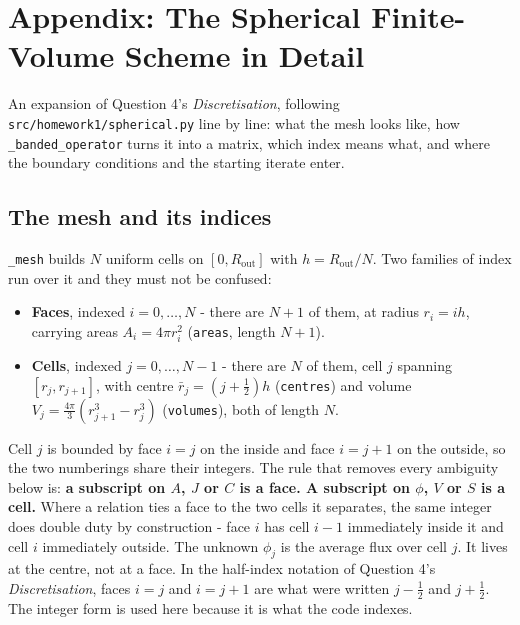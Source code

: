 \documentclass[11pt]{article}
\begin{document}
\clearpage
\appendix

{\color{red}

\section*{Appendix: The Spherical Finite-Volume Scheme in Detail}
\label{app:fv}

An expansion of Question 4's \emph{Discretisation}, following \texttt{src/homework1/spherical.py} line by line: what the mesh looks like, how \texttt{\_banded\_operator} turns it into a matrix, which index means what, and where the boundary conditions and the starting iterate enter.

\subsection*{The mesh and its indices}

\texttt{\_mesh} builds $N$ uniform cells on $[0, R_{\text{out}}]$ with $h = R_{\text{out}}/N$. Two families of index run over it and they must not be confused:

\begin{itemize}
    \item \textbf{Faces}, indexed $i = 0,\dots,N$ - there are $N+1$ of them, at radius $r_i = i h$, carrying areas $A_i = 4\pi r_i^2$ (\texttt{areas}, length $N+1$).
    \item \textbf{Cells}, indexed $j = 0,\dots,N-1$ - there are $N$ of them, cell $j$ spanning $[r_j, r_{j+1}]$, with centre $\bar r_j = (j + \tfrac12)h$ (\texttt{centres}) and volume $V_j = \tfrac{4\pi}{3}(r_{j+1}^3 - r_j^3)$ (\texttt{volumes}), both of length $N$.
\end{itemize}

Cell $j$ is bounded by face $i = j$ on the inside and face $i = j+1$ on the outside, so the two numberings share their integers. The rule that removes every ambiguity below is: \textbf{a subscript on $A$, $J$ or $C$ is a face. A subscript on $\phi$, $V$ or $S$ is a cell.} Where a relation ties a face to the two cells it separates, the same integer does double duty by construction - face $i$ has cell $i-1$ immediately inside it and cell $i$ immediately outside. The unknown $\phi_j$ is the average flux over cell $j$. It lives at the centre, not at a face. In the half-index notation of Question 4's \emph{Discretisation}, faces $i = j$ and $i = j+1$ are what were written $j - \tfrac12$ and $j + \tfrac12$. The integer form is used here because it is what the code indexes.

}
\end{document}

